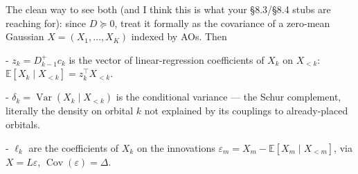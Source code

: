 \documentclass[12pt]{article}
\begin{document}
    The clean way to see both (and I think this is what your §8.3/§8.4 stubs are reaching for): since $D \succeq 0$, treat it formally as the covariance of a zero-mean Gaussian $X = (X_1,\dots,X_K)$ indexed by AOs. Then

    - $z_k = D_{k-1}^{+}c_k$ is the vector of linear-regression coefficients of $X_k$ on $X_{<k}$: $\mathbb{E}[X_k \mid X_{<k}] = z_k^\top X_{<k}$.
    
    - $\delta_k = \operatorname{Var}(X_k \mid X_{<k})$ is the conditional variance — the Schur complement, literally the density on orbital $k$ not explained by its couplings to already-placed orbitals.
    
    - $\ell_k$ are the coefficients of $X_k$ on the innovations $\varepsilon_m = X_m - \mathbb{E}[X_m\mid X_{<m}]$, via $X = L\varepsilon$, $\operatorname{Cov}(\varepsilon)=\Delta$.
        
\end{document}
